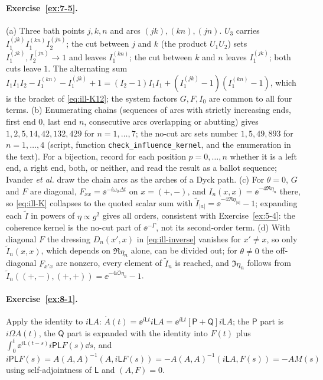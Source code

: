 \paragraph{Exercise~\ref{ex:7-5}.}
(a) Three bath points $j,k,n$ and arcs $(jk),(kn),(jn)$.
$U_3$ carries $I_1^{(jk)}I_1^{(kn)}I_2^{(jn)}$; the cut between $j$ and $k$ (the product $U_1U_2$) sets $I_1^{(jk)},I_2^{(jn)}\to1$ and leaves $I_1^{(kn)}$; the cut between $k$ and $n$ leaves $I_1^{(jk)}$; both cuts leave $1$.
The alternating sum $I_1I_1I_2-I_1^{(kn)}-I_1^{(jk)}+1=(I_2-1)I_1I_1+(I_1^{(jk)}-1)(I_1^{(kn)}-1)$, which is the bracket of \cref{eq:ill-K12}; the system factors $G,F,I_0$ are common to all four terms.
(b) Enumerating chains (sequences of arcs with strictly increasing ends, first end $0$, last end $n$, consecutive arcs overlapping or abutting) gives $1,2,5,14,42,132,429$ for $n=1,\dots,7$; the no-cut arc sets number $1,5,49,893$ for $n=1,\dots,4$ (script, function \texttt{check\_influence\_kernel}, and the enumeration in the text).
For a bijection, record for each position $p=0,\dots,n$ whether it is a left end, a right end, both, or neither, and read the result as a ballot sequence; Ivander \emph{et al.} draw the chain arcs as the arches of a Dyck path.
(c) For $\theta=0$, $G$ and $F$ are diagonal, $F_{xx}=\ee^{-i\omega_0\Delta t}$ on $x=(+,-)$, and $I_n(x,x)=\ee^{-4\Re\eta_n}$ there, so \cref{eq:ill-K} collapses to the quoted scalar sum with $\tilde I_{|a|}=\ee^{-4\Re\eta_{|a|}}-1$; expanding each $\tilde I$ in powers of $\eta\propto g^2$ gives all orders, consistent with Exercise~\ref{ex:5-4}: the coherence kernel is the no-cut part of $\ee^{-\Gamma}$, not its second-order term.
(d) With diagonal $F$ the dressing $D_n(x',x)$ in \cref{eq:ill-inverse} vanishes for $x'\ne x$, so only $\tilde I_n(x,x)$, which depends on $\Re\eta_n$ alone, can be divided out; for $\theta\ne0$ the off-diagonal $F_{x'x}$ are nonzero, every element of $\tilde I_n$ is reached, and $\Im\eta_n$ follows from $\tilde I_n((+,-),(+,+))=\ee^{-4i\Im\eta_n}-1$.

\paragraph{Exercise~\ref{ex:8-1}.}
Apply the identity to $i\mathsf LA$: $\dot A(t)=\ee^{i\mathsf Lt}i\mathsf LA=\ee^{i\mathsf Lt}[\mathsf P+\mathsf Q]i\mathsf LA$; the $\mathsf P$ part is $i\Omega A(t)$, the $\mathsf Q$ part is expanded with the identity into $F(t)$ plus $\int_0^t\ee^{i\mathsf L(t-s)}i\mathsf P\mathsf LF(s)\dd s$, and $i\mathsf P\mathsf LF(s)=A(A,A)^{-1}(A,i\mathsf LF(s))=-A(A,A)^{-1}(i\mathsf LA,F(s))=-AM(s)$ using self-adjointness of $\mathsf L$ and $(A,F)=0$.

